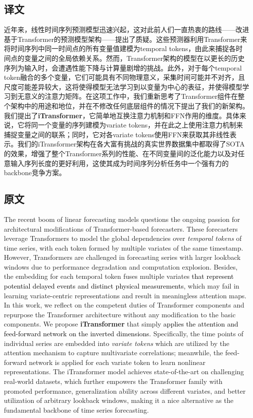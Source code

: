 \documentclass[twoside,12pt]{article}
\newcommand{\update}[1]{{\textcolor{black}{#1}}}
\begin{document}
\subsection{译文}
近年来，线性时间序列预测模型迅速兴起，这对此前人们一直热衷的路线——改进基于Transformer的预测模型架构——提出了质疑。这些预测器利用Transformer来将时间序列中同一时间点的所有变量值建模为temporal tokens，由此来捕捉各时间点的变量之间的全局依赖关系。然而，Transformer架构的模型在以更长的历史序列为输入时，会遭遇性能下降与计算量剧增的挑战。此外，对于每个temporal token融合的多个变量，它们可能具有不同物理意义，采集时间可能并不对齐，且尺度可能差异较大，这将使得模型无法学习到以变量为中心的表征，并使得模型学习到无意义的注意力矩阵。在这项工作中，我们重新思考了Transformer组件在整个架构中的用途和地位，并在不修改任何底层组件的情况下提出了我们的新架构。我们提出了\textbf{iTransformer}，它简单地互换注意力机制和FFN作用的维度。具体来说，它将同一个变量的序列建模为variate tokens，并在此之上使用注意力机制来捕捉变量之间的联系；同时，它对各variate tokens使用FFN来获取其非线性表示。我们的iTransformer架构在各大富有挑战的真实世界数据集中都取得了SOTA的效果，增强了整个Transformer系列的性能、在不同变量间的泛化能力以及对任意输入序列长度的更好利用，这使其成为时间序列分析任务中一个强有力的backbone竞争方案。

\subsection{原文}
The recent boom of linear forecasting models questions the ongoing passion for architectural modifications of Transformer-based forecasters. These forecasters leverage Transformers to model the global dependencies over \emph{temporal tokens} of time series, with each token formed by multiple variates of the same timestamp. However, Transformers are challenged in forecasting series with larger lookback windows due to performance degradation and computation explosion. Besides, the embedding for each temporal token fuses multiple variates \update{that represent potential delayed events and distinct physical measurements}, which may fail in learning variate-centric representations and result in meaningless attention maps. In this work, we reflect on the competent duties of Transformer components and repurpose the Transformer architecture without any modification to the basic components. We propose \textbf{iTransformer} that simply \update{applies the attention and feed-forward network on the inverted dimensions}. Specifically, the time points of individual series are embedded into \emph{variate tokens} which are utilized by the attention mechanism to capture multivariate correlations; meanwhile, the feed-forward network is applied for each variate token to learn nonlinear representations. The iTransformer model achieves state-of-the-art on challenging real-world datasets, which further empowers the Transformer family with promoted performance, generalization ability across different variates, and better utilization of arbitrary lookback windows, making it a nice alternative as the fundamental backbone of time series forecasting.
\end{document}
